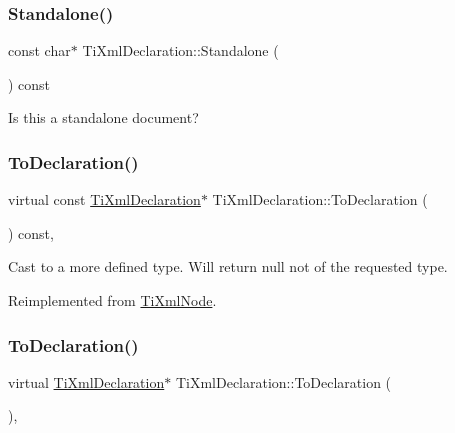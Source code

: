 \subsubsection{\texorpdfstring{Standalone()}{Standalone()}}
{\footnotesize\ttfamily const char$\ast$ Ti\+Xml\+Declaration\+::\+Standalone (\begin{DoxyParamCaption}{ }\end{DoxyParamCaption}) const\hspace{0.3cm}{\ttfamily [inline]}}



Is this a standalone document? 

\mbox{\label{class_ti_xml_declaration_aab62703b620d9b9391b482dc1835ecf6}} 
\subsubsection{\texorpdfstring{To\+Declaration()}{ToDeclaration()}\hspace{0.1cm}{\footnotesize\ttfamily [1/2]}}
{\footnotesize\ttfamily virtual const \hyperlink{class_ti_xml_declaration}{Ti\+Xml\+Declaration}$\ast$ Ti\+Xml\+Declaration\+::\+To\+Declaration (\begin{DoxyParamCaption}{ }\end{DoxyParamCaption}) const\hspace{0.3cm}{\ttfamily [inline]}, {\ttfamily [virtual]}}



Cast to a more defined type. Will return null not of the requested type. 



Reimplemented from \hyperlink{class_ti_xml_node_a0dc0831e89d499ca911a3be61a413d45}{Ti\+Xml\+Node}.

\mbox{\label{class_ti_xml_declaration_a6bd3d1daddcaeb9543c24bfd090969ce}} 
\subsubsection{\texorpdfstring{To\+Declaration()}{ToDeclaration()}\hspace{0.1cm}{\footnotesize\ttfamily [2/2]}}
{\footnotesize\ttfamily virtual \hyperlink{class_ti_xml_declaration}{Ti\+Xml\+Declaration}$\ast$ Ti\+Xml\+Declaration\+::\+To\+Declaration (\begin{DoxyParamCaption}{ }\end{DoxyParamCaption})\hspace{0.3cm}{\ttfamily [inline]}, {\ttfamily [virtual]}}



